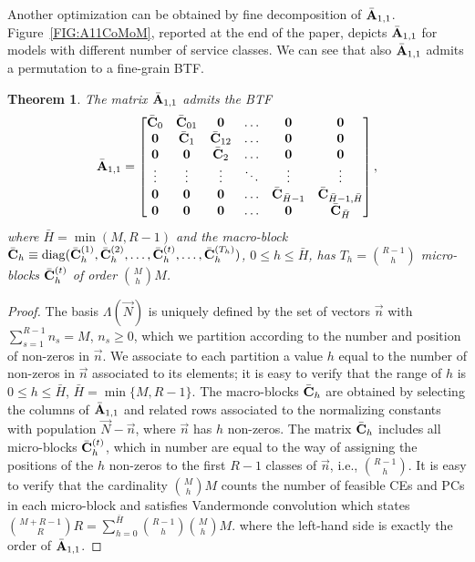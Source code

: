 \documentclass[journal,twocolumn,9.5pt]{IEEEtran}
\newtheorem{theorem}{Theorem}
\newcommand{\comom}[1]{\bar{#1}}
\begin{document}
Another optimization can be obtained by fine decomposition of $\comom{\bf A}_{1,1}$. Figure~\ref{FIG:A11CoMoM}, reported at the end of the paper, depicts $\comom{\bf A}_{1,1}$ for models with different number of service classes. We can see that also  $\comom{\bf A}_{1,1}$ admits a permutation to a fine-grain BTF.

\begin{theorem}
\label{THM:cblock}
{\em
The matrix $\comom{\bf A}_{1,1}$ admits the BTF
\begin{equation}
\label{EQU:cblock} \comom{\bf A}_{1,1}=
\begin{bmatrix}
\comom{\bf C}_{0} & \comom{\bf C}_{01} & {\bf 0}      & \ldots & {\bf 0} & {\bf 0}\\
{\bf 0}      & \comom{\bf C}_{1} & \comom{\bf C}_{12} & \ldots & {\bf 0} & {\bf 0}\\
{\bf 0}      & {\bf 0}      & \comom{\bf C}_{2} & \ldots & {\bf 0} & {\bf 0}\\
\vdots & \vdots & \vdots & \ddots & \vdots & \vdots\\
{\bf 0}      & {\bf 0}      & {\bf 0}      & \ldots & \comom{\bf C}_{\comom{H}-1} & \comom{\bf C}_{\comom{H}-1,\comom{H}} \\
{\bf 0}      & {\bf 0}      & {\bf 0}      & \ldots & {\bf 0} & \comom{\bf C}_{\comom{H}} \\
\end{bmatrix},
\end{equation}
where $\comom{H}=\min(M,R-1)$ and the macro-block
$\comom{\bf C}_{h}\equiv {\rm diag}(\comom{\bf C}^{(1)}_{h},\comom{\bf C}^{(2)}_{h},\ldots,\comom{\bf C}^{(t)}_{h},\ldots,\comom{\bf C}^{(T_h)}_{h})$, $0 \leq h \leq \comom{H}$, has $T_h={R-1 \choose h}$ micro-blocks $\comom{\bf C}^{(t)}_{h}$ of order ${M\choose h}M$.
}\end{theorem}
\begin{proof}
The basis $\Lambda(\vec N)$ is uniquely defined by the set of vectors $\vec n$ with $\sum_{s=1}^{R-1} n_s=M$, $n_s\geq 0$, which we partition according to the number and position of non-zeros in $\vec n$. We associate to each partition a value $h$ equal to the number of non-zeros in $\vec n$ associated to its elements; it is easy to verify that the range of $h$ is $0\leq h\leq \comom{H}$, $\comom{H}=\min\{M,R-1\}$. The macro-blocks $\comom{\bf C}_{h}$ are obtained by selecting the columns of $\comom{\bf A}_{1,1}$ and related rows associated to the normalizing constants with population $\vec N-\vec n$, where $\vec n$ has $h$ non-zeros. The matrix $\comom{\bf C}_h$ includes all micro-blocks $\comom{\bf C}_{h}^{(t)}$, which in number are equal to the way of assigning the positions of the $h$ non-zeros to the first $R-1$ classes of $\vec n$, i.e.,
${R-1 \choose h}$.
It is easy to verify that the cardinality ${M\choose h}M$ counts the number of feasible CEs and PCs in each micro-block and satisfies Vandermonde convolution \cite{Coh78} which states
$
{M+R-1 \choose R}R=\sum_{h=0}^{\comom{H}} {R-1\choose h} {M \choose h}M.
$
where the left-hand side is exactly the order of $\comom{\bf A}_{1,1}$.
\end{proof}
\end{document}
